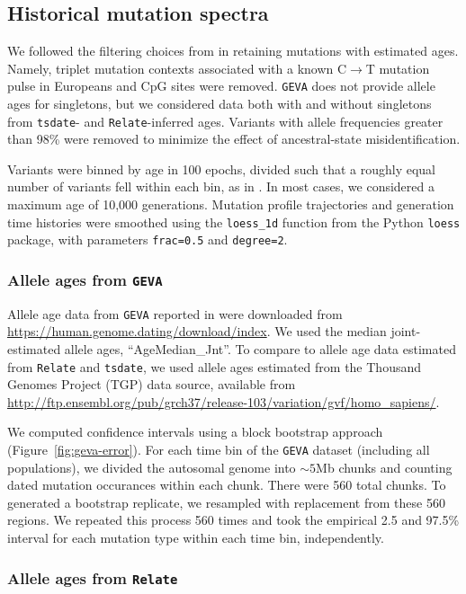 \documentclass[]{article}
\newcommand{\GEVA}{\texttt{GEVA}\xspace}
\newcommand{\tsdate}{\texttt{tsdate}\xspace}
\newcommand{\relate}{\texttt{Relate}\xspace}
\begin{document}
\subsection*{Historical mutation spectra}

We followed the filtering choices from \citet{wang2023human} in retaining
mutations with estimated ages. Namely, triplet mutation contexts associated
with a known C$\rightarrow$T mutation pulse in Europeans
\citep{harris2015evidence} and CpG sites were removed. \GEVA does not provide
allele ages for singletons, but we considered data both with and without
singletons from \tsdate- and \relate-inferred ages. Variants with allele
frequencies greater than 98\% were removed to minimize the effect of
ancestral-state misidentification.

Variants were binned by age in 100 epochs, divided such that a roughly equal
number of variants fell within each bin, as in \citet{wang2023human}. In most
cases, we considered a maximum age of 10,000 generations. Mutation profile
trajectories and generation time histories were smoothed using the
\texttt{loess\_1d} function from the Python \texttt{loess} package, with
parameters \texttt{frac=0.5} and \texttt{degree=2}.

\subsubsection*{Allele ages from \GEVA}

Allele age data from \GEVA reported in \citet{albers2020dating} were downloaded
from \url{https://human.genome.dating/download/index}. We used the median
joint-estimated allele ages, ``AgeMedian\_Jnt''. To compare to allele age data
estimated from \relate and \tsdate, we used allele ages estimated from the
Thousand Genomes Project (TGP) data source, available from
\url{http://ftp.ensembl.org/pub/grch37/release-103/variation/gvf/homo_sapiens/}.

We computed confidence intervals using a block bootstrap approach
(Figure~\ref{fig:geva-error}). For each time bin of the \GEVA dataset
(including all populations), we divided the autosomal genome into $\sim5$Mb
chunks and counting dated mutation occurances within each chunk. There were 560
total chunks. To generated a bootstrap replicate, we resampled with replacement
from these 560 regions. We repeated this process 560 times and took the
empirical 2.5 and 97.5\% interval for each mutation type within each time bin,
independently.

\subsubsection*{Allele ages from \relate}
\end{document}
